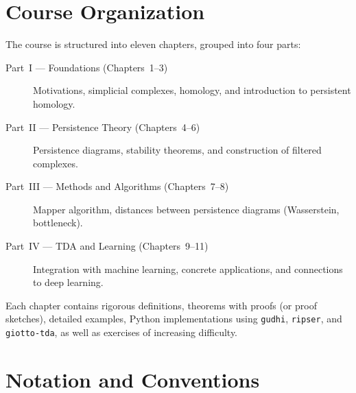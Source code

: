 \section*{Course Organization}

The course is structured into eleven chapters, grouped into four parts:

\begin{description}
  \item[Part~I --- Foundations (Chapters~1--3)]
    Motivations, simplicial complexes, homology, and introduction to
    persistent homology.
  \item[Part~II --- Persistence Theory (Chapters~4--6)]
    Persistence diagrams, stability theorems, and construction of
    filtered complexes.
  \item[Part~III --- Methods and Algorithms (Chapters~7--8)]
    Mapper algorithm, distances between persistence diagrams
    (Wasserstein, bottleneck).
  \item[Part~IV --- TDA and Learning (Chapters~9--11)]
    Integration with machine learning, concrete applications, and
    connections to deep learning.
\end{description}

Each chapter contains rigorous definitions, theorems with proofs (or proof
sketches), detailed examples, Python implementations using \texttt{gudhi},
\texttt{ripser}, and \texttt{giotto-tda}, as well as exercises of
increasing difficulty.

\section*{Notation and Conventions}

